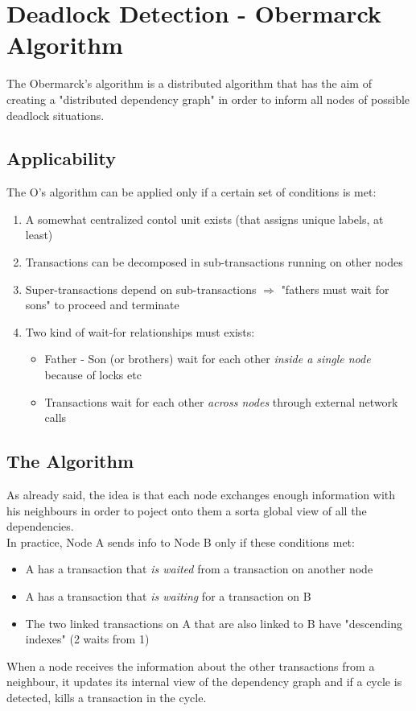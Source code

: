 \documentclass{article}
\begin{document}
		\section{Deadlock Detection - Obermarck Algorithm}
			The Obermarck's algorithm is a distributed algorithm that has the aim of creating a "distributed dependency graph" in order to inform all nodes of possible deadlock situations.

			\subsection{Applicability}
				The O's algorithm can be applied only if a certain set of conditions is met:
				\begin{enumerate}
					\item A somewhat centralized contol unit exists (that assigns unique labels, at least)
					\item Transactions can be decomposed in sub-transactions running on other nodes
					\item Super-transactions depend on sub-transactions $\Rightarrow$ "fathers must wait for sons" to proceed and terminate
					\item Two kind of wait-for relationships must exists: 
						\begin{itemize}
							\item Father - Son (or brothers) wait for each other \textit{inside a single node} because of locks etc
							\item Transactions wait for each other \textit{across nodes} through external network calls
						\end{itemize}
				\end{enumerate}

			\subsection{The Algorithm}
				As already said, the idea is that each node exchanges enough information with his neighbours in order to poject onto them a sorta global view of all the dependencies.\\
				In practice, Node A sends info to Node B only if these conditions met:
				\begin{itemize}
					\item A has a transaction that \textit{is waited} from a transaction on another node
					\item A has a transaction that \textit{is waiting} for a transaction on B
					\item The two linked transactions on A that are also linked to B have "descending indexes" (2 waits from 1)
				\end{itemize}
				When a node receives the information about the other transactions from a neighbour, it updates its internal view of the dependency graph and if a cycle is detected, kills a transaction in the cycle.\\
\end{document}
